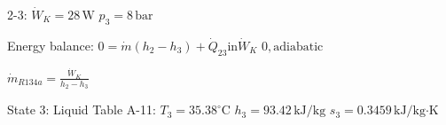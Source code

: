 2-3:  
\( \dot{W}_K = 28 \, \text{W} \)  
\( p_3 = 8 \, \text{bar} \)  

Energy balance:  
\( 0 = \dot{m} (h_2 - h_3) + \dot{Q}_{23} \text{in} \dot{W}_K \)  
\( 0, \text{adiabatic} \)  

\( \dot{m}_{R134a} = \frac{\dot{W}_K}{h_2 - h_3} \)  

State 3:  
Liquid  
Table A-11: \( T_3 = 35.38^\circ \text{C} \)  
\( h_3 = 93.42 \, \text{kJ/kg} \)  
\( s_3 = 0.3459 \, \text{kJ/kg·K} \)